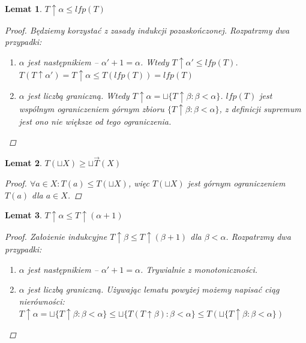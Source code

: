 \documentclass[10pt,a4paper]{article}
\theoremstyle{plain}
\newtheorem{lemma}{Lemat}
\theoremstyle{definition}
\begin{document}
\begin{lemma}
 $ T \uparrow \alpha \leq lfp(T)$
\begin{proof}
 Będziemy korzystać z zasady indukcji pozaskończonej. Rozpatrzmy dwa przypadki:
 \begin{enumerate}
  \item $\alpha$ jest następnikiem -- $\alpha' + 1 = \alpha$. 
	Wtedy $T \uparrow \alpha' \leq lfp(T)$.\\
	$T(T \uparrow \alpha') = T \uparrow \alpha \leq T(lfp(T)) = lfp(T)$
  \item $\alpha$ jest liczbą graniczną. Wtedy $T \uparrow \alpha = 
	\sqcup \lbrace T \uparrow \beta : \beta < \alpha \rbrace$.
	$lfp(T)$ jest wspólnym ograniczeniem górnym zbioru 
	$\lbrace T \uparrow \beta : \beta < \alpha \rbrace$, z definicji supremum 
	jest ono nie większe od tego ograniczenia.
 \end{enumerate}
\end{proof}
\end{lemma}

\begin{lemma}
 $T(\sqcup X) \geq \sqcup \overrightarrow{T}(X)$
 \begin{proof}
 $\forall a \in X: T(a) \leq T(\sqcup X)$, więc $T(\sqcup X)$ jest górnym
 ograniczeniem $T(a)$ dla $a \in X$.
 \end{proof}
\end{lemma}


\begin{lemma}
 $ T \uparrow \alpha \leq T \uparrow (\alpha + 1)$
\begin{proof}
 Założenie indukcyjne $ T \uparrow \beta \leq T \uparrow (\beta + 1)$ dla $\beta < \alpha$. Rozpatrzmy dwa przypadki:
 \begin{enumerate}
  \item $\alpha$ jest następnikiem -- $\alpha' + 1 = \alpha$. Trywialnie z monotoniczności.
  \item $\alpha$ jest liczbą graniczną. Używając lematu powyżej możemy napisać ciąg nierówności: \\
  $ T \uparrow \alpha = \sqcup \lbrace T \uparrow \beta : \beta < \alpha \rbrace \leq 
    \sqcup \lbrace  T(T \uparrow \beta) : \beta < \alpha \rbrace \leq
    T(\sqcup \lbrace  T \uparrow \beta : \beta < \alpha \rbrace) $
 \end{enumerate}
\end{proof}
\end{lemma}
\end{document}
